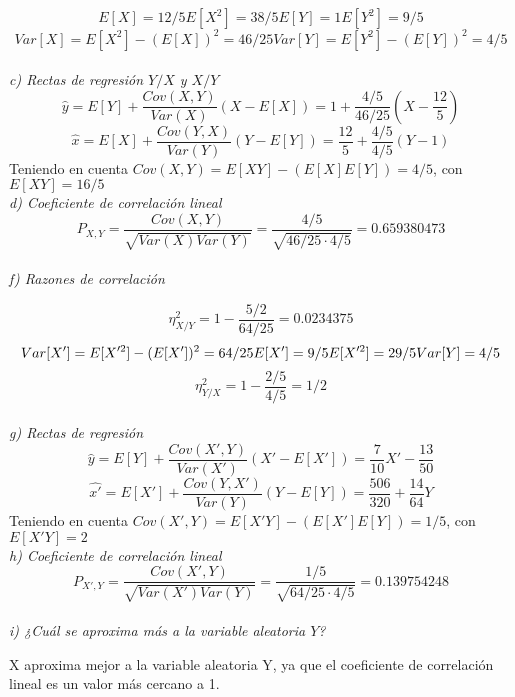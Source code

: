 \documentclass[fleqn]{article}
\begin{document}
    \begin{equation*}
        E[X] = 12/5
        E[X^2] = 38/5
        E[Y] = 1
        E[Y^2] = 9/5
    \end{equation*}
    \begin{equation*}
        Var[X] = E[X^2]-(E[X])^2 = 46/25
        Var[Y] = E[Y^2]-(E[Y])^2 = 4/5
    \end{equation*}\\

    \textit{c) Rectas de regresión $Y/X$ y $X/Y$}
    $$\hat{y}= E[Y] + \frac{Cov(X,Y)}{Var(X)}(X-E[X]) = 1 + \frac{4/5}{46/25}(X-\frac{12}{5})$$
    $$\hat{x}= E[X] + \frac{Cov(Y,X)}{Var(Y)}(Y-E[Y]) = \frac{12}{5} + \frac{4/5}{4/5}(Y-1)$$
    Teniendo en cuenta $Cov(X,Y) = E[XY]-(E[X]E[Y])=4/5$, con $E[XY]=16/5$\\

    \textit{d) Coeficiente de correlación lineal}
    $$P_{X,Y} = \frac{Cov(X,Y)}{\sqrt{Var(X)Var(Y)}} = \frac{4/5}{\sqrt{46/25 \cdot 4/5}} = 0.659380473$$\\

    \textit{f) Razones de correlación}

    $$\eta_{X/Y}^2 = 1 -\frac{5/2}{64/25} = 0.0234375$$
    \begin{equation*}
        Var[X'] = E[X'^2]-(E[X'])^2 = 64/25\\ \\
        E[X']= 9/5\\ \\
        E[X'^2] = 29/5\\ \\
        Var[Y]= 4/5\\ \\
    \end{equation*}
    $$\eta_{Y/X}^2 = 1 -\frac{2/5}{4/5} = 1/2$$\\

    \textit{g) Rectas de regresión}
    $$\hat{y}= E[Y] + \frac{Cov(X',Y)}{Var(X')}(X'-E[X']) = \frac{7}{10}X'-\frac{13}{50}$$
    $$\hat{x'}= E[X'] + \frac{Cov(Y,X')}{Var(Y)}(Y-E[Y]) = \frac{506}{320} + \frac{14}{64}Y$$
    Teniendo en cuenta $Cov(X',Y) = E[X'Y]-(E[X']E[Y])=1/5$, con $E[X'Y]=2$\\

    \textit{h) Coeficiente de correlación lineal}
    $$P_{X',Y} = \frac{Cov(X',Y)}{\sqrt{Var(X')Var(Y)}} = \frac{1/5}{\sqrt{64/25 \cdot 4/5}} = 0.139754248$$\\

    \textit{i) ¿Cuál se aproxima más a la variable aleatoria $Y$?}

    X aproxima mejor a la variable aleatoria Y, ya que el coeficiente de correlación lineal es un valor más cercano a 1.
\end{document}
